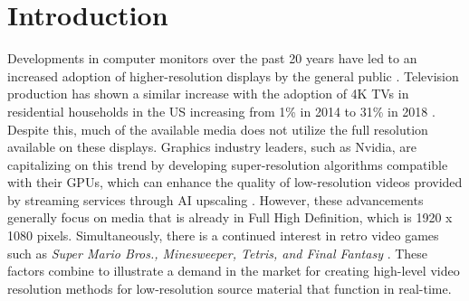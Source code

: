 \documentclass{article}
\begin{document}
\newpage %
\tableofcontents %
\listoftables %
\listoffigures %

\newpage %
\setcounter{page}{1} %

\section{Introduction} 
\label{sec:intro}
\noindent Developments in computer monitors over the past 20 years have led to an increased adoption of higher-resolution displays by the general public \cite{noauthor_browser_nodate}. Television production has shown a similar increase with the adoption of 4K TVs in residential households in the US increasing from 1\% in 2014 to 31\% in 2018 \cite{4k_prevalence}. Despite this, much of the available media does not utilize the full resolution available on these displays. Graphics industry leaders, such as Nvidia, are capitalizing on this trend by developing super-resolution algorithms compatible with their GPUs, which can enhance the quality of low-resolution videos provided by streaming services through AI upscaling \cite{choi_pixel_2023}. However, these advancements generally focus on media that is already in Full High Definition, which is 1920 x 1080 pixels. Simultaneously, there is a continued interest in retro video games such as \textit{Super Mario Bros., Minesweeper, Tetris, and Final Fantasy} \cite{retro_games}. These factors combine to illustrate a demand in the market for creating high-level video resolution methods for low-resolution source material that function in real-time. 
\end{document}
